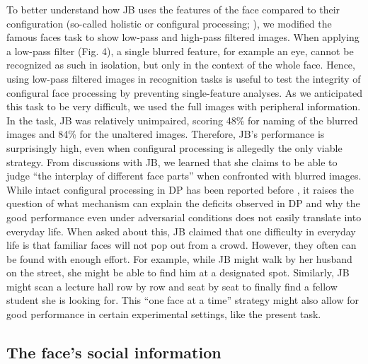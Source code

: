 \documentclass[fleqn,10pt]{SelfArx} %
\begin{document}
To better understand how JB uses the features of the face compared to their configuration (so-called holistic or configural processing; \citet{Maurer_2002}), we modified the famous faces task to show low-pass and high-pass filtered images. When applying a low-pass filter (Fig. 4), a single blurred feature, for example an eye, cannot be recognized as such in isolation, but only in the context of the whole face. Hence, using low-pass filtered images in recognition tasks is useful to test the integrity of configural face processing by preventing single-feature analyses. As we anticipated this task to be very difficult, we used the full images with peripheral information. In the task, JB was relatively unimpaired, scoring 48\% for naming of the blurred images and 84\% for the unaltered images. Therefore, JB's performance is surprisingly high, even when configural processing is allegedly the only viable strategy. From discussions with JB, we learned that she claims to be able to judge “the interplay of different face parts” when confronted with blurred images. While intact configural processing in DP has been reported before \citep{Duchaine_2000, Le_Grand_2006}, it raises the question of what mechanism can explain the deficits observed in DP and why the good performance even under adversarial conditions does not easily translate into everyday life. When asked about this, JB claimed that one difficulty in everyday life is that familiar faces will not pop out from a crowd. However, they often can be found with enough effort. For example, while JB might walk by her husband on the street, she might be able to find him at a designated spot. Similarly, JB might scan a lecture hall row by row and seat by seat to finally find a fellow student she is looking for. This “one face at a time” strategy might also allow for good performance in certain experimental settings, like the present task.



\subsection*{The face's social information}
\end{document}

